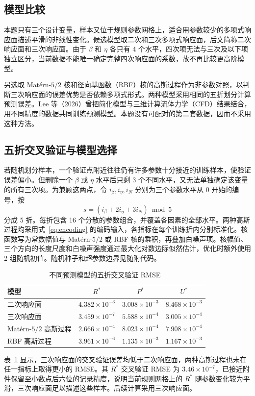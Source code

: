 \documentclass[withoutpreface,bwprint]{cumcmthesis}
\newcommand{\Rstar}{R^{*}}
\newcommand{\Pstar}{P^{*}}
\newcommand{\Ustar}{U^{*}}
\begin{document}
\subsection{模型比较}
本题只有三个设计变量，样本又位于规则参数网格上，适合用参数较少的多项式响应面描述平滑的非线性变化\cite{BoxWilson1951,He2024}。候选模型取二次和三次多项式响应面，后文简称二次响应面和三次响应面。由于 $\beta$ 和 $\eta$ 各只有 4 个水平，四次项无法与三次及以下项独立区分，当前数据不能唯一确定完整四次响应面的系数，故不再比较更高阶模型。

另选取 Mat\'ern-$5/2$ 核和径向基函数（RBF）核的高斯过程作为非参数对照\cite{RasmussenWilliams2005}，以判断三次响应面的误差优势是否依赖多项式形式。两种模型采用相同的五折划分计算预测误差。Lee 等（2026）曾把简化模型与三维计算流体力学（CFD）结果结合，用不同精度的数据共同训练预测模型\cite{Lee2026}。本题没有可配对的第二套数据，因而不采用这种方法。

\subsection{五折交叉验证与模型选择}
若随机划分样本，一个验证点附近往往仍有许多参数十分接近的训练样本，使验证误差偏小。但删除一个 $\beta$ 或 $\eta$ 水平后只剩 3 个不同水平，又无法单独确定该变量的所有三次项。为兼顾这两点，令 $i_\beta,i_\eta,i_N$ 分别为三个参数水平从 0 开始的编号，按
\begin{equation*}
s=(i_\beta+2i_\eta+3i_N)\bmod5
\end{equation*}
分成 5 折。每折包含 16 个分散的参数组合，并覆盖各因素的全部水平。两种高斯过程均采用式~\eqref{eq:encoding} 的编码输入，各指标在每个训练折内分别标准化。核函数写为常数幅值与 Mat\'ern-$5/2$ 或 RBF 核的乘积，再叠加白噪声项。核幅值、三个方向的长度尺度和白噪声强度通过最大化对数边际似然估计，优化时额外使用 2 组随机初值。随机种子和超参数边界见随附代码。
\begin{table}[H]
\centering
\caption{不同预测模型的五折交叉验证 RMSE}
\label{tab:cv}
\begin{tabular}{lccc}
\toprule
模型 & $\Rstar$ & $\Pstar$ & $\Ustar$\\
\midrule
二次响应面 & $4.382\times10^{-3}$ & $3.008\times10^{-3}$ & $8.468\times10^{-3}$\\
三次响应面 & $3.459\times10^{-7}$ & $5.588\times10^{-4}$ & $3.005\times10^{-4}$\\
Mat\'ern-$5/2$ 高斯过程 & $2.666\times10^{-4}$ & $8.023\times10^{-4}$ & $7.908\times10^{-4}$\\
RBF 高斯过程 & $3.961\times10^{-6}$ & $1.135\times10^{-3}$ & $1.167\times10^{-3}$\\
\bottomrule
\end{tabular}
\end{table}
表~\ref{tab:cv} 显示，三次响应面的交叉验证误差均低于二次响应面，两种高斯过程也未在任一指标上取得更小的 RMSE。其 $\Rstar$ 交叉验证 RMSE 为 $3.46\times10^{-7}$，已接近附件保留至小数点后六位的记录精度，说明当前规则网格上的 $\Rstar$ 随参数变化较为平滑，三次响应面足以描述这些样本。后续计算采用三次响应面。
\end{document}
